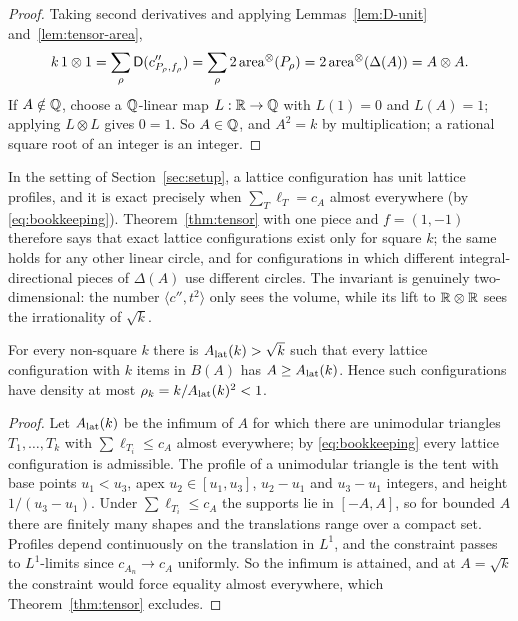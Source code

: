 \documentclass[11pt]{amsart}
\begin{document}
\begin{proof}
Taking second derivatives and applying Lemmas~\ref{lem:D-unit} and~\ref{lem:tensor-area},
\[
k\,1\otimes1=\sum_\rho\mathsf{D}(c''_{P_\rho,f_\rho})=\sum_\rho2\operatorname{area}^\otimes(P_\rho)=2\operatorname{area}^\otimes(\Delta(A))=A\otimes A .
\]
If $A\notin\mathbb{Q}$, choose a $\mathbb{Q}$-linear map $L:\mathbb{R}\to\mathbb{Q}$ with $L(1)=0$ and $L(A)=1$; applying $L\otimes L$ gives $0=1$.
So $A\in\mathbb{Q}$, and $A^2=k$ by multiplication; a rational square root of an integer is an integer.
\end{proof}

In the setting of Section~\ref{sec:setup}, a lattice configuration has unit lattice profiles, and it is exact
precisely when $\sum_T\ell_T=c_A$ almost everywhere (by \eqref{eq:bookkeeping}). Theorem~\ref{thm:tensor} with one
piece and $f=(1,-1)$ therefore says that exact lattice configurations exist only for square $k$; the same holds for
any other linear circle, and for configurations in which different integral-directional pieces of $\Delta(A)$ use
different circles. The invariant is genuinely two-dimensional: the number $\langle c'',t^2\rangle$ only sees the
volume, while its lift to $\mathbb{R}\otimes\mathbb{R}$ sees the irrationality of $\sqrt k$.

\begin{corollary}\label{cor:gap}
For every non-square $k$ there is $A_{\rm lat}(k)>\sqrt k$ such that every lattice configuration with $k$ items in $B(A)$ has
$A\ge A_{\rm lat}(k)$. Hence such configurations have density at most $\rho_k=k/A_{\rm lat}(k)^2<1$.
\end{corollary}

\begin{proof}
Let $A_{\rm lat}(k)$ be the infimum of $A$ for which there are unimodular triangles $T_1,\dots,T_k$ with
$\sum\ell_{T_i}\le c_A$ almost everywhere; by \eqref{eq:bookkeeping} every lattice configuration is admissible. The
profile of a unimodular triangle is the tent with base points $u_1<u_3$, apex $u_2\in[u_1,u_3]$, $u_2-u_1$ and
$u_3-u_1$ integers, and height $1/(u_3-u_1)$. Under $\sum\ell_{T_i}\le c_A$ the supports lie in $[-A,A]$, so for
bounded $A$ there are finitely many shapes and the translations range over a compact set. Profiles depend
continuously on the translation in $L^1$, and the constraint passes to $L^1$-limits since $c_{A_n}\to c_A$ uniformly.
So the infimum is attained, and at $A=\sqrt k$ the constraint would force equality almost everywhere, which
Theorem~\ref{thm:tensor} excludes.
\end{proof}
\end{document}
